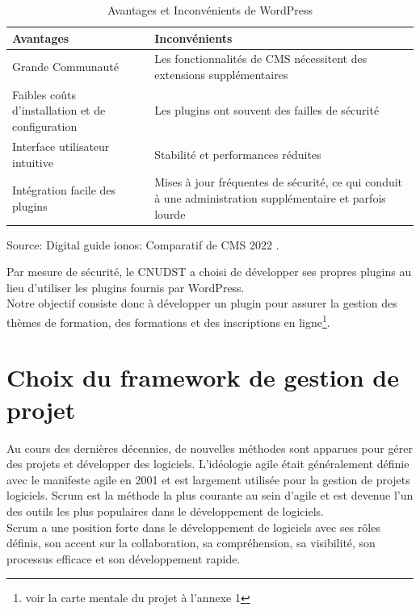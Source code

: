 \begin{table}[!h]
	\centering %
	\begin{tabular}{ |p{7cm}|p{7cm}| } 
	
		
		\hline%
	\textbf{Avantages} & \textbf{Inconvénients} \\
		\hline
		 Grande Communauté & Les fonctionnalités de CMS nécessitent des extensions supplémentaires\\ 
		 	\hline  
		Faibles coûts d'installation et de configuration & Les plugins ont souvent des failles de sécurité   \\ 
			\hline
		 Interface utilisateur intuitive & Stabilité et performances réduites\\
		  	\hline
		 Intégration facile des plugins & Mises à jour fréquentes de sécurité, ce qui conduit à une administration supplémentaire et parfois lourde  \\ 
	  
		\hline \hline
	
	\end{tabular}
	\begin{flushright}
		\footnotesize Source: Digital guide ionos: Comparatif de CMS 2022 .\end{flushright}
	\caption{Avantages et Inconvénients de WordPress}
\end{table}
Par mesure de sécurité, le CNUDST a choisi de développer ses propres plugins au lieu d'utiliser les plugins fournis par WordPress.\\
Notre objectif consiste donc à développer un plugin pour assurer la gestion des thèmes de formation, des formations et des inscriptions en ligne\footnote{voir la carte mentale du projet à l'annexe 1}.

\section{Choix du framework de gestion de projet}
Au cours des dernières décennies, de nouvelles méthodes sont apparues pour gérer des projets et développer des logiciels. L'idéologie agile était
généralement définie avec le manifeste agile en 2001 et est largement utilisée pour la gestion de projets logiciels. Scrum est
la méthode la plus courante au sein d'agile et est devenue l'un des outils les plus populaires dans le développement de logiciels.\\
Scrum
a une position forte dans le développement de logiciels avec ses rôles définis, son accent sur la collaboration, sa compréhension, sa visibilité, son processus efficace et son développement rapide.

